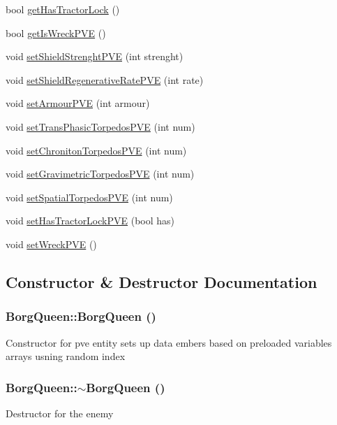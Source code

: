 \begin{DoxyCompactItemize}
\item 
bool \hyperlink{classBorgQueen_a81cff66b42f357056b5eba4517b1651a}{getHasTractorLock} ()
\item 
bool \hyperlink{classBorgQueen_a52250f09cbd95239db7ea68174ad2c83}{getIsWreckPVE} ()
\item 
void \hyperlink{classBorgQueen_a28ca84d583ef28a844f420188a575d74}{setShieldStrenghtPVE} (int strenght)
\item 
void \hyperlink{classBorgQueen_adb0b4021391f1268f39c9ee5b9a0305b}{setShieldRegenerativeRatePVE} (int rate)
\item 
void \hyperlink{classBorgQueen_a0aa26287b343e1b26179d1ffd903c2f5}{setArmourPVE} (int armour)
\item 
void \hyperlink{classBorgQueen_a7533de67e36cdd6ed501c71f0ce1867f}{setTransPhasicTorpedosPVE} (int num)
\item 
void \hyperlink{classBorgQueen_a5fa2745710ae1da9d884066b8d248b9a}{setChronitonTorpedosPVE} (int num)
\item 
void \hyperlink{classBorgQueen_aff5f63cf6299acc846a40d6653dad809}{setGravimetricTorpedosPVE} (int num)
\item 
void \hyperlink{classBorgQueen_a702e59cd2edc9823b54e9db4c7edf174}{setSpatialTorpedosPVE} (int num)
\item 
void \hyperlink{classBorgQueen_af00311c06f2c000c32dc8f6837bfe945}{setHasTractorLockPVE} (bool has)
\item 
void \hyperlink{classBorgQueen_a9f508246423f214a0c585ee914d4fb96}{setWreckPVE} ()
\end{DoxyCompactItemize}


\subsection{Constructor \& Destructor Documentation}
\hypertarget{classBorgQueen_a76607d47c521568462adcc3c3b65cbce}{
\subsubsection[{BorgQueen}]{\setlength{\rightskip}{0pt plus 5cm}BorgQueen::BorgQueen ()}}
\label{d6/d8d/classBorgQueen_a76607d47c521568462adcc3c3b65cbce}
Constructor for pve entity sets up data embers based on preloaded variables arrays usning random index \hypertarget{classBorgQueen_a5e2d0c2a5b5c3b00088776e2272c17f0}{
\subsubsection[{$\sim$BorgQueen}]{\setlength{\rightskip}{0pt plus 5cm}BorgQueen::$\sim$BorgQueen ()}}
\label{d6/d8d/classBorgQueen_a5e2d0c2a5b5c3b00088776e2272c17f0}
Destructor for the enemy 

